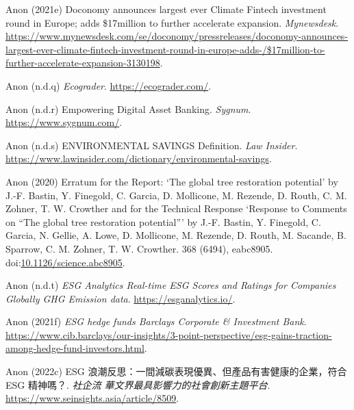 \documentclass[
  letterpaper,
  DIV=11,
  numbers=noendperiod]{scrartcl}
\newlength{\cslhangindent}
\newenvironment{CSLReferences}[2] %
 {\begin{list}{}{%
  \setlength{\itemindent}{0pt}
  \setlength{\leftmargin}{0pt}
  \setlength{\parsep}{0pt}
  \ifodd #1
   \setlength{\leftmargin}{\cslhangindent}
   \setlength{\itemindent}{-1\cslhangindent}
  \fi
  \setlength{\itemsep}{#2\baselineskip}}}
 {\end{list}}
\begin{document}
\begin{CSLReferences}{0}{1}
Anon (2021e) {Doconomy announces largest ever Climate Fintech investment
round in Europe; adds \$17million to further accelerate expansion}.
\emph{Mynewsdesk}.
\url{https://www.mynewsdesk.com/se/doconomy/pressreleases/doconomy-announces-largest-ever-climate-fintech-investment-round-in-europe-adds-/$17million-to-further-accelerate-expansion-3130198}.

Anon (n.d.q) \emph{Ecograder}. \url{https://ecograder.com/}.

Anon (n.d.r) Empowering {Digital Asset Banking}. \emph{Sygnum}.
\url{https://www.sygnum.com/}.

Anon (n.d.s) {ENVIRONMENTAL SAVINGS Definition}. \emph{Law Insider}.
\url{https://www.lawinsider.com/dictionary/environmental-savings}.

Anon (2020) Erratum for the {Report}: {`{The} global tree restoration
potential'} by {J}.-{F}. {Bastin}, {Y}. {Finegold}, {C}. {Garcia}, {D}.
{Mollicone}, {M}. {Rezende}, {D}. {Routh}, {C}. {M}. {Zohner}, {T}. {W}.
{Crowther} and for the {Technical Response} {`{Response} to {Comments}
on {``{The} global tree restoration potential''}'} by {J}.-{F}.
{Bastin}, {Y}. {Finegold}, {C}. {Garcia}, {N}. {Gellie}, {A}. {Lowe},
{D}. {Mollicone}, {M}. {Rezende}, {D}. {Routh}, {M}. {Sacande}, {B}.
{Sparrow}, {C}. {M}. {Zohner}, {T}. {W}. {Crowther}. 368 (6494),
eabc8905.
doi:\href{https://doi.org/10.1126/science.abc8905}{10.1126/science.abc8905}.

Anon (n.d.t) \emph{{ESG Analytics} {\textbar} {Real-time ESG Scores} and
{Ratings} for {Companies Globally} {\textbar} {GHG Emission} data}.
\url{https://esganalytics.io/}.

Anon (2021f) \emph{{ESG} hedge funds {\textbar} {Barclays Corporate} \&
{Investment Bank}}.
\url{https://www.cib.barclays/our-insights/3-point-perspective/esg-gains-traction-among-hedge-fund-investors.html}.

Anon (2022c) {ESG 浪潮反思：一間減碳表現優異、但產品有害健康的企業，符合
ESG 精神嗎？}. \emph{社企流 {\textbar}
華文界最具影響力的社會創新主題平台}.
\url{https://www.seinsights.asia/article/8509}.


\end{CSLReferences}
\end{document}
